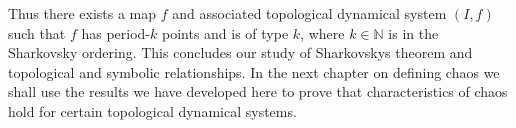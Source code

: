 Thus there exists a map $f$ and associated topological dynamical system $(I, f)$ such that $f$ has period-$k$ points and is of type $k$, where $k \in \mathbb{N}$ is in the Sharkovsky ordering. This concludes our study of Sharkovskys theorem and topological and symbolic relationships. In the next chapter on defining chaos we shall use the results we have developed here to prove that characteristics of chaos hold for certain topological dynamical systems.